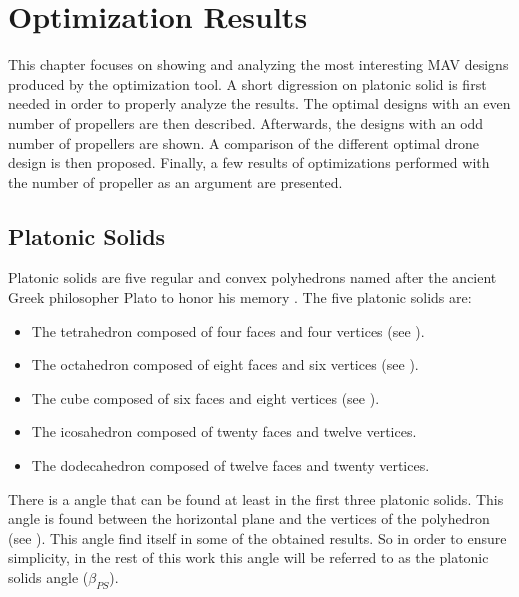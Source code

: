 \chapter{Optimization Results}
\label{sec:optimization_results}
This chapter focuses on showing and analyzing the most interesting MAV designs
produced by the optimization tool. A short digression on platonic solid is first
needed in order to properly analyze the results. The optimal designs with an even number
of propellers are then described. Afterwards, the designs with an odd number of
propellers are shown. A comparison of the different optimal drone design is then
proposed. Finally, a few results of optimizations performed with the number of
propeller as an argument are presented.

\section{Platonic Solids}
\label{sec:platonic_solids}
Platonic solids are five regular and convex polyhedrons named after the
ancient Greek philosopher Plato to honor his memory \citep{noauthor_platonic_2018}.
The five platonic solids are:
{\small\begin{itemize}
\item The tetrahedron composed of four faces and four vertices (see ).
\item The octahedron composed of eight faces and six vertices (see ).
\item The cube composed of six faces and eight vertices (see ).
\item The icosahedron composed of twenty faces and twelve vertices.
\item The dodecahedron composed of twelve faces and twenty vertices.
\end{itemize}}
There is a angle that can be found at least in the
first three platonic solids. This angle is found between the horizontal plane and
the vertices of the polyhedron (see ). This angle find itself
in some of the obtained results. So in order to ensure simplicity,
in the rest of this work this angle will be referred to as the platonic solids angle
($\beta_{PS}$).

